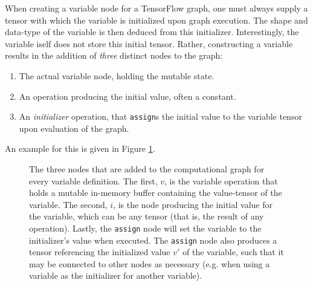 When creating a variable node for a TensorFlow graph, one must always supply a
tensor with which the variable is initialized upon graph execution. The shape
and data-type of the variable is then deduced from this
initializer. Interestingly, the variable iself does not store this initial
tensor. Rather, constructing a variable results in the addition of \emph{three}
distinct nodes to the graph:

\begin{enumerate}
  \item The actual variable node, holding the mutable state.
  \item An operation producing the initial value, often a constant.
  \item An \emph{initializer} operation, that \texttt{assign}s the initial value
    to the variable tensor upon evaluation of the graph.
\end{enumerate}

An example for this is given in Figure \ref{fig:variable}.

\begin{figure}[h!]
  \centering
  \label{fig:variable}
  \caption{The three nodes that are added to the computational graph for every
    variable definition. The first, $v$, is the variable operation that holds a
    mutable in-memory buffer containing the value-tensor of the variable. The
    second, $i$, is the node producing the initial value for the variable, which
    can be any tensor (that is, the result of any operation). Lastly, the
    \texttt{assign} node will set the variable to the initializer's value when
    executed. The \texttt{assign} node also produces a tensor referencing the
    initialized value $v'$ of the variable, such that it may be connected to
    other nodes as necessary (e.g. when using a variable as the initializer for
    another variable). }
\end{figure}

